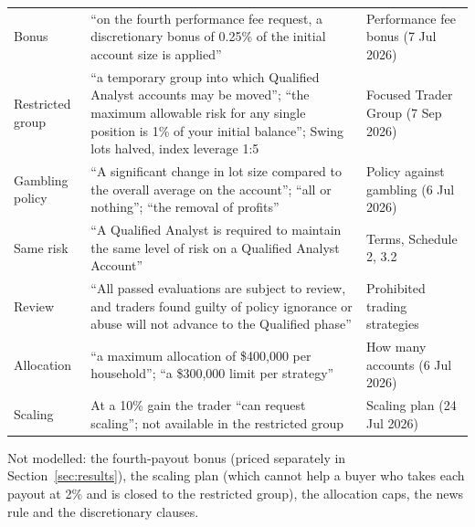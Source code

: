\documentclass[11pt]{article}
\begin{document}
\begin{longtable}{L{3.0cm}L{8.2cm}L{3.6cm}}
Bonus & ``on the fourth performance fee request, a discretionary bonus of 0.25\% of the initial account size is applied'' & Performance fee bonus (7 Jul 2026)\\
Restricted group & ``a temporary group into which Qualified Analyst accounts may be moved''; ``the maximum allowable risk for any single position is 1\% of your initial balance''; Swing lots halved, index leverage 1:5 & Focused Trader Group (7 Sep 2026)\\
Gambling policy & ``A significant change in lot size compared to the overall average on the account''; ``all or nothing''; ``the removal of profits'' & Policy against gambling (6 Jul 2026)\\
Same risk & ``A Qualified Analyst is required to maintain the same level of risk on a Qualified Analyst Account'' & Terms, Schedule 2, 3.2\\
Review & ``All passed evaluations are subject to review, and traders found guilty of policy ignorance or abuse will not advance to the Qualified phase'' & Prohibited trading strategies\\
Allocation & ``a maximum allocation of \$400,000 per household''; ``a \$300,000 limit per strategy'' & How many accounts (6 Jul 2026)\\
Scaling & At a 10\% gain the trader ``can request scaling''; not available in the restricted group & Scaling plan (24 Jul 2026)\\
\bottomrule
\end{longtable}

\noindent Not modelled: the fourth-payout bonus (priced separately in Section~\ref{sec:results}), the scaling plan
(which cannot help a buyer who takes each payout at 2\% and is closed to the restricted group), the allocation
caps, the news rule and the discretionary clauses.
\end{document}
